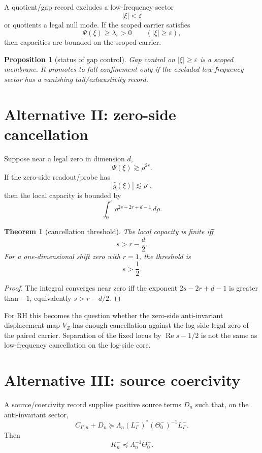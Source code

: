 \documentclass[11pt]{article}
\newtheorem{theorem}{Theorem}
\newtheorem{proposition}{Proposition}
\begin{document}
A quotient/gap record excludes a low-frequency sector
\[
|\xi|<\varepsilon
\]
or quotients a legal null mode.  If the scoped carrier satisfies
\[
\Psi(\xi)\ge \lambda_\varepsilon>0
\qquad (|\xi|\ge \varepsilon),
\]
then capacities are bounded on the scoped carrier.

\begin{proposition}[status of gap control]
Gap control on \( |\xi|\ge \varepsilon\) is a scoped membrane. It promotes to full confinement only if the excluded low-frequency sector has a vanishing tail/exhaustivity record.
\end{proposition}

\section{Alternative II: zero-side cancellation}

Suppose near a legal zero in dimension \(d\),
\[
\Psi(\xi)\gtrsim \rho^{2r}.
\]
If the zero-side readout/probe has
\[
|\widehat g(\xi)|\lesssim \rho^s,
\]
then the local capacity is bounded by
\[
\int_0^\epsilon \rho^{2s-2r+d-1}\,d\rho.
\]

\begin{theorem}[cancellation threshold]
The local capacity is finite iff
\[
s>r-\frac d2.
\]
For a one-dimensional shift zero with \(r=1\), the threshold is
\[
s>\frac12.
\]
\end{theorem}

\begin{proof}
The integral converges near zero iff the exponent \(2s-2r+d-1\) is greater than \(-1\), equivalently \(s>r-d/2\).
\end{proof}

For RH this becomes the question whether the zero-side anti-invariant displacement map \(V_Z\) has enough cancellation against the log-side legal zero of the paired carrier.  Separation of the fixed locus by \( \operatorname{Re}s-1/2\) is not the same as low-frequency cancellation on the log-side core.

\section{Alternative III: source coercivity}

A source/coercivity record supplies positive source terms \(D_n\) such that, on the anti-invariant sector,
\[
C_{\Gamma,n}+D_n
\succeq
\Lambda_n (L^-_\Gamma)^*(\Theta_0^-)^{-1}L^-_\Gamma.
\]
Then
\[
K_n^- \preceq \Lambda_n^{-1}\Theta_0^-.
\]
\end{document}
